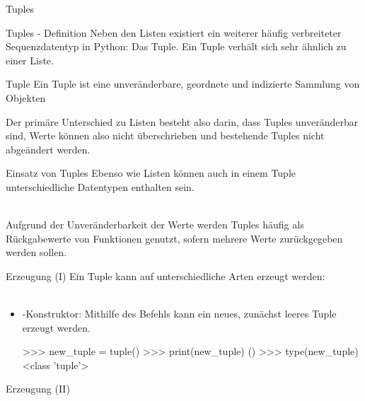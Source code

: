     \begin{subsection}{Tuples}
    
        \begin{frame}{Tuples - Definition}
            Neben den Listen existiert ein weiterer häufig verbreiteter Sequenzdatentyp in Python: Das Tuple. Ein Tuple verhält sich sehr ähnlich zu einer Liste.
            
            \begin{block}{Tuple}
                Ein Tuple ist eine unveränderbare, geordnete und indizierte Sammlung von Objekten
            \end{block}
            
            Der primäre Unterschied zu Listen besteht also darin, dass Tuples unveränderbar sind, Werte können also nicht überschrieben und bestehende Tuples nicht abgeändert werden.
        \end{frame}
        
        \begin{frame}{Einsatz von Tuples}
            Ebenso wie Listen können auch in einem Tuple unterschiedliche Datentypen enthalten sein. \\~\
            
            Aufgrund der Unveränderbarkeit der Werte werden Tuples häufig als Rückgabewerte von Funktionen genutzt, sofern mehrere Werte zurückgegeben werden sollen.
        \end{frame}
        
        \begin{frame}[fragile]{Erzeugung (I)}
            Ein Tuple kann auf unterschiedliche Arten erzeugt werden: \\~\
            
            \begin{itemize}
                \item {}-Konstruktor: Mithilfe des Befehls  kann ein neues, zunächst leeres Tuple erzeugt werden.
                
\begin{pyconcode}
>>> new_tuple = tuple()
>>> print(new_tuple)
()
>>> type(new_tuple)
<class 'tuple'>
\end{pyconcode}                 
            \end{itemize}
        \end{frame}
        
        \begin{frame}[fragile]{Erzeugung (II)}
            

\end{frame}
\end{subsection}
